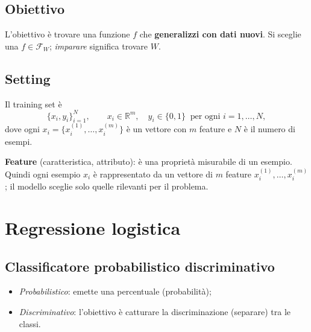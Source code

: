 \documentclass[11pt,a4paper]{article}
\newcommand{\R}{\mathbb{R}}
\begin{document}
\begin{center}
\end{center}

\subsection{Obiettivo}
L'obiettivo è trovare una funzione $f$ che \textbf{generalizzi con dati nuovi}. Si sceglie una $f \in \mathcal{F}_W$; \emph{imparare} significa trovare $W$.

\subsection{Setting}
\begin{definizione}
Il training set è
\[
\{x_i, y_i\}_{i=1}^{N}, \qquad x_i \in \R^m, \quad y_i \in \{0,1\}\ \text{ per ogni } i=1,\dots,N,
\]
dove ogni $x_i = \{x_i^{(1)}, \dots, x_i^{(m)}\}$ è un vettore con $m$ feature e $N$ è il numero di esempi.
\end{definizione}

\textbf{Feature} (caratteristica, attributo): è una proprietà misurabile di un esempio. Quindi ogni esempio $x_i$ è rappresentato da un vettore di $m$ feature $x_i^{(1)}, \dots, x_i^{(m)}$; il modello sceglie solo quelle rilevanti per il problema.

\section{Regressione logistica}

\subsection{Classificatore probabilistico discriminativo}
\begin{itemize}
  \item \emph{Probabilistico}: emette una percentuale (probabilità);
  \item \emph{Discriminativo}: l'obiettivo è catturare la discriminazione (separare) tra le classi.
\end{itemize}
\end{document}
